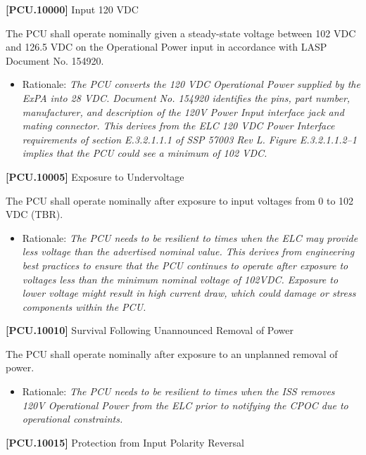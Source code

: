 \documentclass[12pt,oneside,oldfontcommands]{memoir}
\begin{document}
\textbf{[PCU.10000]} Input 120 \gls{VDC}

The \gls{PCU} shall operate nominally given a steady-state voltage between 102 \gls{VDC} and 126.5 \gls{VDC} on the Operational Power input in accordance with \gls{LASP} Document No. 154920.

\begin{itemize}
\item{} Rationale: \emph{The PCU converts the 120 VDC Operational Power supplied by the ExPA into 28 VDC. Document No. 154920 identifies the pins, part number, manufacturer, and description of the 120V Power Input interface jack and mating connector. This derives from the ELC 120 VDC Power Interface requirements of section E.3.2.1.1.1 of SSP 57003 Rev L. Figure E.3.2.1.1.2--1 implies that the PCU could see a minimum of 102 VDC.}

\end{itemize}

\textbf{[PCU.10005]} Exposure to Undervoltage

The \gls{PCU} shall operate nominally after exposure to input voltages from 0 to 102 \gls{VDC} (TBR\label{tbx_4}).

\begin{itemize}
\item{} Rationale: \emph{The PCU needs to be resilient to times when the ELC may provide less voltage than the advertised nominal value. This derives from engineering best practices to ensure that the PCU continues to operate after exposure to voltages less than the minimum nominal voltage of 102VDC. Exposure to lower voltage might result in high current draw, which could damage or stress components within the PCU.}

\end{itemize}

\textbf{[PCU.10010]} Survival Following Unannounced Removal of Power

The \gls{PCU} shall operate nominally after exposure to an unplanned removal of power.

\begin{itemize}
\item{} Rationale: \emph{The PCU needs to be resilient to times when the ISS removes 120V Operational Power from the ELC prior to notifying the CPOC due to operational constraints.}

\end{itemize}

\textbf{[PCU.10015]} Protection from Input Polarity Reversal
\end{document}
